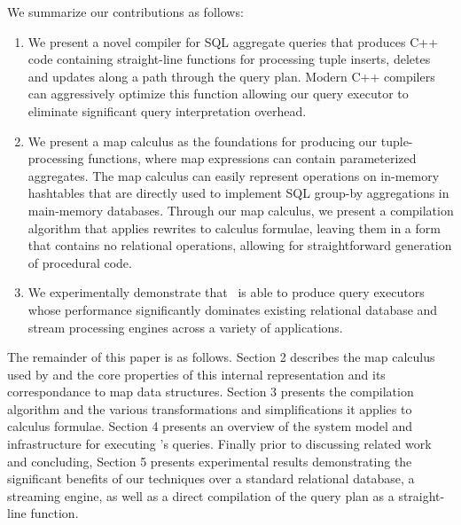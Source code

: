 We summarize our contributions as follows:

\begin{enumerate}
  \item We present a novel compiler for SQL aggregate queries that produces C++
code containing straight-line functions for processing tuple inserts, deletes
and updates along a path through the query plan. Modern C++ compilers can
aggressively optimize this function allowing our query executor to eliminate
significant query interpretation overhead.
  \item We present a map calculus as the foundations for producing our
tuple-processing functions, where map expressions can contain parameterized
aggregates. The map calculus can easily represent operations on in-memory
hashtables that are directly used to implement SQL group-by aggregations in
main-memory data\-ba\-ses. Through our map calculus, we present a compilation
algorithm that applies rewrites to calculus formulae, leaving them in a
form that contains no relational operations, allowing for straightforward
generation of procedural code.
  \item We experimentally demonstrate that \compiler\ is able to produce query
executors whose performance significantly dominates existing relational database
and stream processing engines across a variety of applications.
\end{enumerate}

The remainder of this paper is as follows. Section 2 describes the map calculus
used by \compiler and the core properties of this internal representation and
its correspondance to map data structures. Section 3 presents the compilation
algorithm and the various transformations and simplifications it applies to
calculus formulae. Section 4 presents an overview of the system model and
infrastructure for executing \compiler's queries. Finally prior to discussing
related work and concluding, Section 5 presents experimental results
demonstrating the significant benefits of our techniques over a standard
relational database, a streaming engine, as well as a direct compilation of the
query plan as a straight-line function.

